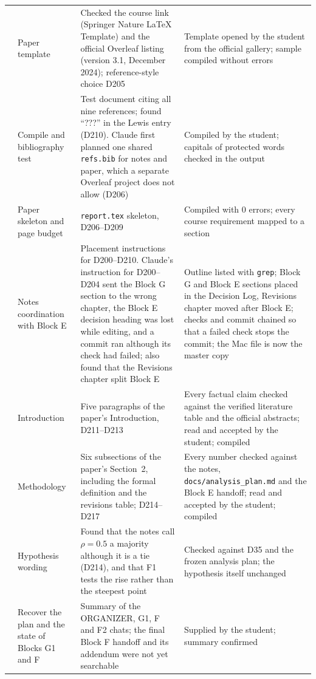 \documentclass[11pt,a4paper]{report}
\begin{document}
{\begin{longtable}{
  >{\raggedright\arraybackslash}p{0.6cm}
  >{\raggedright\arraybackslash}p{4.4cm}
  >{\raggedright\arraybackslash}p{4.4cm}
  >{\raggedright\arraybackslash}p{4.8cm}}
135 & Paper template
  & Checked the course link (Springer Nature LaTeX Template) and the official Overleaf listing (version 3.1, December 2024); reference-style choice D205
  & Template opened by the student from the official gallery; sample compiled without errors \\
136 & Compile and bibliography test
  & Test document citing all nine references; found ``???'' in the Lewis entry (D210). Claude first planned one shared \texttt{refs.bib} for notes and paper, which a separate Overleaf project does not allow (D206)
  & Compiled by the student; capitals of protected words checked in the output \\
137 & Paper skeleton and page budget
  & \texttt{report.tex} skeleton, D206--D209
  & Compiled with 0 errors; every course requirement mapped to a section \\
138 & Notes coordination with Block E
  & Placement instructions for D200--D210. Claude's instruction for D200--D204 sent the Block G section to the wrong chapter, the Block E decision heading was lost while editing, and a commit ran although its check had failed; also found that the Revisions chapter split Block E
  & Outline listed with \texttt{grep}; Block G and Block E sections placed in the Decision Log, Revisions chapter moved after Block E; checks and commit chained so that a failed check stops the commit; the Mac file is now the master copy \\
139 & Introduction
  & Five paragraphs of the paper's Introduction, D211--D213
  & Every factual claim checked against the verified literature table and the official abstracts; read and accepted by the student; compiled \\
140 & Methodology
  & Six subsections of the paper's Section~2, including the formal definition and the revisions table; D214--D217
  & Every number checked against the notes, \texttt{docs/analysis\_plan.md} and the Block E handoff; read and accepted by the student; compiled \\
141 & Hypothesis wording
  & Found that the notes call $\rho=0.5$ a majority although it is a tie (D214), and that F1 tests the rise rather than the steepest point
  & Checked against D35 and the frozen analysis plan; the hypothesis itself unchanged \\
200 & Recover the plan and the state of Blocks G1 and F
  & Summary of the ORGANIZER, G1, F and F2 chats; the final Block F handoff and its addendum were not yet searchable
  & Supplied by the student; summary confirmed \\

\end{longtable}}
\end{document}
